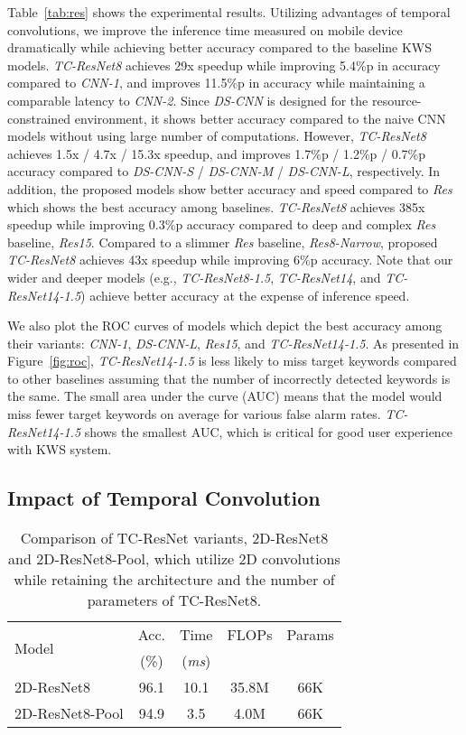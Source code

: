 \documentclass[a4paper]{article}
\begin{document}
Table~\ref{tab:res} shows the experimental results.
Utilizing advantages of temporal convolutions, we improve the inference time measured on mobile device dramatically while achieving better accuracy compared to the baseline KWS models.
\textit{TC-ResNet8} achieves 29x speedup while improving 5.4\%p in accuracy compared to \textit{CNN-1}, and improves 11.5\%p in accuracy while maintaining a comparable latency to \textit{CNN-2}.
Since \emph{DS-CNN} is designed for the resource-constrained environment, it shows better accuracy compared to the naive CNN models without using large number of computations.
However, \emph{TC-ResNet8} achieves 1.5x / 4.7x / 15.3x speedup, and improves 1.7\%p / 1.2\%p / 0.7\%p accuracy compared to \emph{DS-CNN-S} / \emph{DS-CNN-M} / \emph{DS-CNN-L}, respectively.
In addition, the proposed models show better accuracy and speed compared to \emph{Res} which shows the best accuracy among baselines. 
\emph{TC-ResNet8} achieves 385x speedup while improving 0.3\%p accuracy compared to deep and complex \emph{Res} baseline, \emph{Res15}.
Compared to a slimmer \emph{Res} baseline, \emph{Res8-Narrow}, proposed \emph{TC-ResNet8} achieves 43x speedup while improving 6\%p accuracy.
Note that our wider and deeper models (e.g., \textit{TC-ResNet8-1.5}, \textit{TC-ResNet14}, and \textit{TC-ResNet14-1.5}) achieve better accuracy at the expense of inference speed.

We also plot the ROC curves of models which depict the best accuracy among their variants: \emph{CNN-1}, \emph{DS-CNN-L}, \emph{Res15}, and \emph{TC-ResNet14-1.5}.
As presented in Figure~\ref{fig:roc}, \emph{TC-ResNet14-1.5} is less likely to miss target keywords compared to other baselines assuming that the number of incorrectly detected keywords is the same.
The small area under the curve (AUC) means that the model would miss fewer target keywords on average for various false alarm rates.
\emph{TC-ResNet14-1.5} shows the smallest AUC, which is critical for good user experience with KWS system.


\subsection{Impact of Temporal Convolution}

\begin{table}[h]
    \begin{tabular}{lcccc}
        \toprule
        \multirow{2}{*}{Model} & Acc. & Time & FLOPs & Params \\
                              & (\%) & (\emph{ms})     &       & \\
        \midrule
        2D-ResNet8              & 96.1 & 10.1  & 35.8M & 66K \\
        2D-ResNet8-Pool         & 94.9 & 3.5   & 4.0M  & 66K \\
        \bottomrule
    \end{tabular}
    \caption{Comparison of TC-ResNet variants, 2D-ResNet8 and 2D-ResNet8-Pool, which utilize 2D convolutions while retaining the architecture and the number of parameters of TC-ResNet8.
    }
    \vspace{-0.6cm}
    \label{tab:impact-1d}
\end{table}
\end{document}
